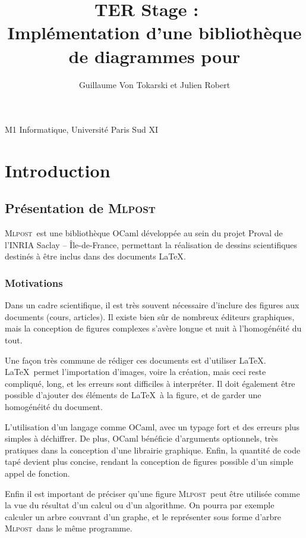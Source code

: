 \documentclass[a4paper,12pt]{article}
\title{\huge{TER Stage : ~\\
  Implémentation d'une bibliothèque de diagrammes pour \mlpost}}
\author{ Guillaume Von Tokarski et Julien Robert}
\newcommand{\mlpost}{\textsc{Mlpost}}
\begin{document}
\maketitle

\begin{center}M1 Informatique, Université Paris Sud XI\end{center}
\newpage
\tableofcontents
\newpage
\section{Introduction}

\subsection{Présentation de \mlpost}
\mlpost\ est une bibliothèque OCaml développée au sein du projet Proval de l’INRIA Saclay – Île-de-France, permettant la réalisation de dessins scientifiques destinés à être inclus dans des documents \LaTeX \cite{mlpost}.

\subsubsection{Motivations}
Dans un cadre scientifique, il est très souvent nécessaire d'inclure des figures aux documents (cours, articles). Il existe bien sûr de nombreux éditeurs graphiques, mais la conception de figures complexes s'avère longue et nuit à l'homogénéité du tout. 
\bigskip 

Une façon très commune de rédiger ces documents est d'utiliser \LaTeX. \LaTeX\ permet l'importation d'images, voire la création, mais ceci reste compliqué, long, et les erreurs sont difficiles à interpréter. Il doit également être possible d'ajouter des éléments de \LaTeX\ à la figure, et de garder une homogénéité du document. 
\bigskip

L'utilisation d'un langage comme OCaml, avec un typage fort et des erreurs plus simples à déchiffrer. De plus, OCaml bénéficie d'arguments optionnels, très pratiques dans la conception d'une librairie graphique. Enfin, la quantité de code tapé devient plus concise, rendant la conception de figures possible d'un simple appel de fonction.

Enfin il est important de préciser qu'une figure \mlpost\ peut être utilisée comme la vue du résultat d'un calcul ou d'un algorithme. On pourra par exemple calculer un arbre couvrant d'un graphe, et le représenter sous forme d'arbre \mlpost\ dans le même programme.
\end{document}
